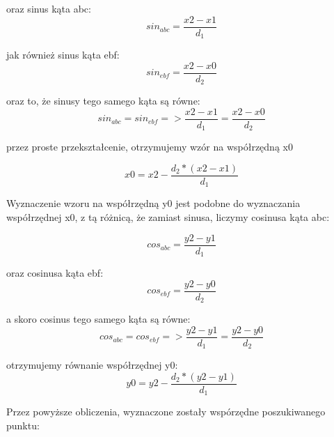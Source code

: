 oraz sinus kąta abc:
\begin{equation} \label{eq:sinABC}
sin_{abc} = \frac{x2 - x1}{d_1}
\end{equation}\newline

jak również sinus kąta ebf:
\begin{equation} \label{eq:sinEBF}
sin_{ebf} = \frac{x2 - x0}{d_2}
\end{equation}\newline

oraz to, że sinusy tego samego kąta są równe:
\begin{equation} \label{eq:sinEBF}
sin_{abc} = sin_{ebf} => \frac{x2 - x1}{d_1} = \frac{x2 - x0}{d_2}
\end{equation}\newline

przez proste przekształcenie, otrzymujemy wzór na współrzędną x0

\begin{equation} \label{eq:x0Coordinates}
x0 = x2 - \frac{d_2*(x2 - x1)}{d_1}
\end{equation}\newline

Wyznaczenie wzoru na współrzędną y0 jest podobne do wyznaczania współrzędnej x0, z tą różnicą, że zamiast sinusa, liczymy cosinusa kąta abc:

\begin{equation} \label{eq:cosABC}
cos_{abc} = \frac{y2 - y1}{d_1}
\end{equation}\newline

oraz cosinusa kąta ebf:
\begin{equation} \label{eq:cosEBF}
cos_{ebf} = \frac{y2 - y0}{d_2}
\end{equation}\newline

a skoro cosinus tego samego kąta są równe:
\begin{equation} \label{eq:cosEBF}
cos_{abc} = cos_{ebf} => \frac{y2 - y1}{d_1} = \frac{y2 - y0}{d_2}
\end{equation}\newline

otrzymujemy równanie współrzędnej y0:
\begin{equation} \label{eq:cosEBF}
y0 = y2 - \frac{d_2*(y2 - y1)}{d_1}
\end{equation}\newline

Przez powyższe obliczenia, wyznaczone zostały wspórzędne poszukiwanego punktu:

